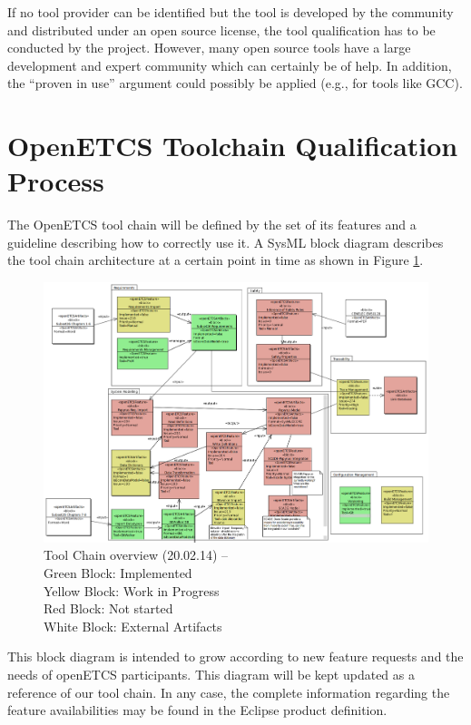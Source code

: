 If no tool provider can be identified but the tool is developed by the community and distributed under an open source license, the tool qualification has to be conducted by the project. However, many open source tools have a large development and expert community which can certainly be of help. In addition, the ``proven in use'' argument could possibly be applied (e.g., for tools like GCC).


\section{OpenETCS Toolchain Qualification Process}
\label{sec:toolchain-qualification-process}

The OpenETCS tool chain  will be defined by the set of its features and
a guideline describing how to correctly use it.
A SysML block diagram describes the tool chain architecture at a certain point in time as shown in
Figure \ref{fig:overview}. 
\begin{figure}[htbp]
\includegraphics[width=\textwidth]{ToolChainmodel}
\caption{\label{fig:overview} Tool Chain overview (20.02.14) -- \\
  Green Block: Implemented \\
  Yellow Block: Work in Progress \\
  Red Block: Not started \\
  White Block: External Artifacts} 
\end{figure}

This block diagram is intended to grow according to new feature requests and the
needs of openETCS participants.  This diagram will be kept updated
as a reference of our tool chain. In any case, the complete information
regarding the feature availabilities  may be found in the Eclipse product
definition.

